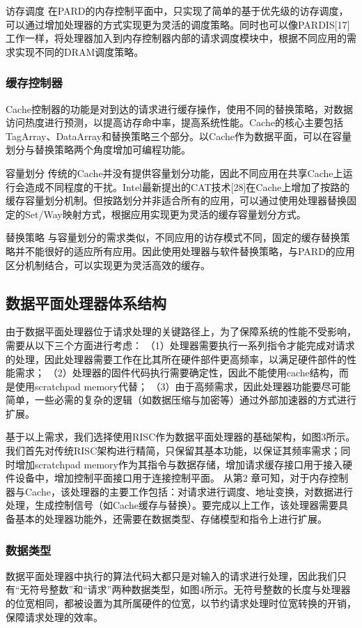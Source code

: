访存调度 在PARD的内存控制平面中，只实现了简单的基于优先级的访存调度，可以通过增加处理器的方式实现更为灵活的调度策略。同时也可以像PARDIS[17]工作一样，将处理器加入到内存控制器内部的请求调度模块中，根据不同应用的需求实现不同的DRAM调度策略。

\subsubsection*{缓存控制器}
Cache控制器的功能是对到达的请求进行缓存操作，使用不同的替换策略，对数据访问热度进行预测，以提高访存命中率，提高系统性能。Cache的核心主要包括TagArray、DataArray和替换策略三个部分。以Cache作为数据平面，可以在容量划分与替换策略两个角度增加可编程功能。

容量划分 传统的Cache并没有提供容量划分功能，因此不同应用在共享Cache上运行会造成不同程度的干扰。Intel最新提出的CAT技术[28]在Cache上增加了按路的缓存容量划分机制。但按路划分并非适合所有的应用，可以通过使用处理器替换固定的Set/Way映射方式，根据应用实现更为灵活的缓存容量划分方式。

替换策略 与容量划分的需求类似，不同应用的访存模式不同，固定的缓存替换策略并不能很好的适应所有应用。因此使用处理器与软件替换策略，与PARD的应用区分机制结合，可以实现更为灵活高效的缓存。


\subsection{数据平面处理器体系结构}

由于数据平面处理器位于请求处理的关键路径上，为了保障系统的性能不受影响，需要从以下三个方面进行考虑：
（1）处理器需要执行一系列指令才能完成对请求的处理，因此处理器需要工作在比其所在硬件部件更高频率，以满足硬件部件的性能需求；
（2）处理器的固件代码执行需要确定性，因此不能使用cache结构，而是使用scratchpad memory代替；
（3）由于高频需求，因此处理器功能要尽可能简单，一些必需的复杂的逻辑（如数据压缩与加密等）通过外部加速器的方式进行扩展。
 
基于以上需求，我们选择使用RISC作为数据平面处理器的基础架构，如图3所示。我们首先对传统RISC架构进行精简，只保留其基本功能，以保证其频率需求；同时增加scratchpad memory作为其指令与数据存储，增加请求缓存接口用于接入硬件设备中，增加控制平面接口用于连接控制平面。
从第2 章可知，对于内存控制器与Cache，该处理器的主要工作包括：对请求进行调度、地址变换，对数据进行处理，生成控制信号（如Cache缓存与替换）。要完成以上工作，该处理器需要具备基本的处理器功能外，还需要在数据类型、存储模型和指令上进行扩展。

\subsubsection{数据类型}
数据平面处理器中执行的算法代码大都只是对输入的请求进行处理，因此我们只有``无符号整数''和``请求''两种数据类型，如图4所示。无符号整数的长度与处理器的位宽相同，都被设置为其所属硬件的位宽，以节约请求处理时位宽转换的开销，保障请求处理的效率。
 

